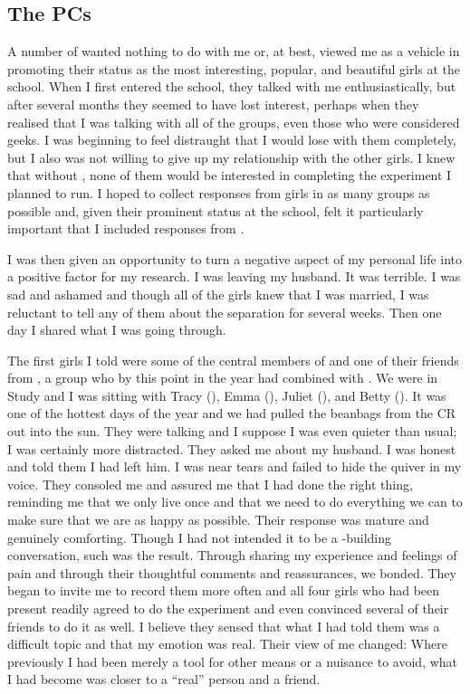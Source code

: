 \subsection{The PCs}
A number of  wanted nothing to do with me or, at best, viewed me as a vehicle in promoting their status as the most interesting, popular, and beautiful girls at the school. When I first entered the school, they talked with me enthusiastically, but after several months they seemed to have lost interest, perhaps when they realised that I was talking with all of the groups, even those who were considered geeks. I was beginning to feel distraught that I would lose  with them completely, but I also was not willing to give up my relationship with the other girls. I knew that without , none of them would be interested in completing the  experiment I planned to run. I hoped to collect responses from girls in as many groups as possible and, given their prominent status at the school, felt it particularly important that I included responses from .

I was then given an opportunity to turn a negative aspect of my personal life into a positive factor for my research. I was leaving my husband. It was terrible. I was sad and ashamed and though all of the girls knew that I was married, I was reluctant to tell any of them about the separation for several weeks. Then one day I shared what I was going through. 

The first girls I told were some of the central members of  and one of their friends from , a group who by this point in the year had combined with . We were in Study and I was sitting with Tracy (), Emma (), Juliet (), and Betty (). It was one of the hottest days of the year and we had pulled the beanbags from the CR out into the sun. They were talking and I suppose I was even quieter than usual; I was certainly more distracted. They asked me about my husband. I was honest and told them I had left him. I was near tears and failed to hide the quiver in my voice. They consoled me and assured me that I had done the right thing, reminding me that we only live once and that we need to do everything we can to make sure that we are as happy as possible. Their response was mature and genuinely comforting. Though I had not intended it to be a -building conversation, such was the result. Through sharing my experience and feelings of pain and through their thoughtful comments and reassurances, we bonded. They began to invite me to record them more often and all four girls who had been present readily agreed to do the  experiment and even convinced several of their friends to do it as well. I believe they sensed that what I had told them was a difficult topic and that my emotion was real. Their view of me changed: Where previously I had been merely a tool for other means or a nuisance to avoid, what I had become was closer to a ``real'' person and a friend.

